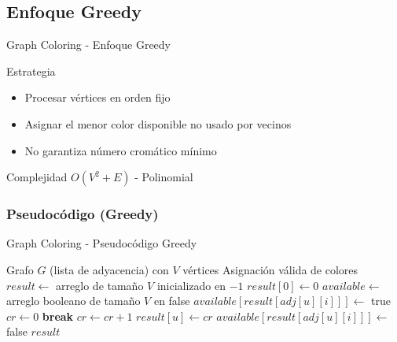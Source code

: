 \documentclass[aspectratio=169]{beamer}
\renewcommand{\algorithmicrequire}{\textbf{Entrada:}}
\renewcommand{\algorithmicensure}{\textbf{Salida:}}
\newcommand{\REQUIRE}{\State[\algorithmicrequire]}
\newcommand{\ENSURE}{\State[\algorithmicensure]}
\begin{document}
\subsection{Enfoque Greedy}
\begin{frame}{Graph Coloring - Enfoque Greedy}
\begin{block}{Estrategia}
\begin{itemize}
\item Procesar vértices en orden fijo
\item Asignar el menor color disponible no usado por vecinos
\item No garantiza número cromático mínimo
\end{itemize}
\end{block}

\begin{alertblock}{Complejidad}
$O(V^2 + E)$ - Polinomial
\end{alertblock}
\end{frame}

\subsubsection{Pseudocódigo (Greedy)}
\begin{frame}[fragile]{Graph Coloring - Pseudocódigo Greedy}
\scriptsize
\begin{algorithmic}[1]
\REQUIRE Grafo $G$ (lista de adyacencia) con $V$ vértices
\ENSURE Asignación válida de colores
\State $result \leftarrow$ arreglo de tamaño $V$ inicializado en $-1$ 
\State $result[0] \leftarrow 0$ 
\State $available \leftarrow$ arreglo booleano de tamaño $V$ en false 
            \State $available[result[adj[u][i]]] \leftarrow$ true
        \EndIf
    \EndFor
    \State $cr \leftarrow 0$
            \State \textbf{break}
        \EndIf
        \State $cr \leftarrow cr + 1$
    \EndWhile
    \State $result[u] \leftarrow cr$ 
            \State $available[result[adj[u][i]]] \leftarrow$ false
        \EndIf
    \EndFor
\EndFor
\Return $result$
\end{algorithmic}
\normalsize
\end{frame}
\end{document}
